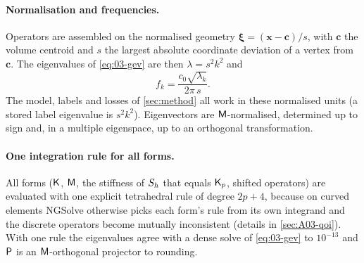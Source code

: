 \paragraph{Normalisation and frequencies.}
Operators are assembled on the normalised geometry $\boldsymbol\xi=(\mathbf x-\mathbf c)/s$, with $\mathbf c$ the volume centroid and $s$ the largest
absolute coordinate deviation of a vertex from $\mathbf c$. The eigenvalues of \eqref{eq:03-gev} are then $\lambda=s^2k^2$ and
\begin{equation}\label{eq:03-freq}
  f_k=\frac{c_0\sqrt{\lambda_k}}{2\pi\,s}.
\end{equation}
The model, labels and losses of \cref{sec:method} all work in these normalised units (a stored label eigenvalue is $s^2k^2$). Eigenvectors are $\mathsf{M}$-normalised, determined up to sign and, in a multiple eigenspace, up to an orthogonal transformation.

\paragraph{One integration rule for all forms.}
All forms ($\mathsf{K}$, $\mathsf{M}$, the stiffness of $S_h$ that equals $\Kp$, shifted operators) are evaluated with one explicit tetrahedral rule of degree $2p+4$, %
because on curved elements NGSolve otherwise picks each form's rule from its own integrand and the discrete operators become mutually inconsistent (details in \cref{sec:A03-qoi}). With one rule the eigenvalues agree
with a dense solve of \eqref{eq:03-gev} to $10^{-13}$ %
and $\mathsf{P}$ is an $\mathsf{M}$-orthogonal projector to rounding.

